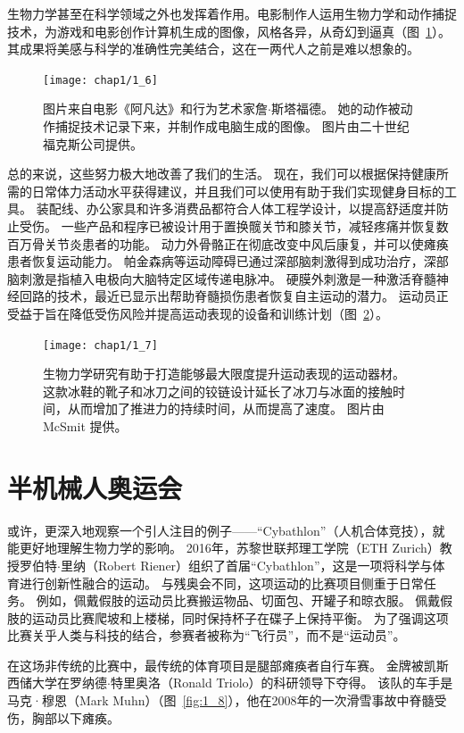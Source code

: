 生物力学甚至在科学领域之外也发挥着作用。电影制作人运用生物力学和动作捕捉技术，为游戏和电影创作计算机生成的图像，风格各异，从奇幻到逼真（图~\ref{fig:1_6}）。
其成果将美感与科学的准确性完美结合，这在一两代人之前是难以想象的。


\begin{figure}[!htb]
	\centering
	\texttt{[image: chap1/1\_6]}
	\caption{图片来自电影《阿凡达》和行为艺术家詹$\cdot$斯塔福德。
		她的动作被动作捕捉技术记录下来，并制作成电脑生成的图像。
		图片由二十世纪福克斯公司提供。 \label{fig:1_6}}
\end{figure}


总的来说，这些努力极大地改善了我们的生活。
现在，我们可以根据保持健康所需的日常体力活动水平获得建议，并且我们可以使用有助于我们实现健身目标的工具。
装配线、办公家具和许多消费品都符合人体工程学设计，以提高舒适度并防止受伤。
一些产品和程序已被设计用于置换髋关节和膝关节，减轻疼痛并恢复数百万骨关节炎患者的功能。
动力外骨骼正在彻底改变中风后康复，并可以使瘫痪患者恢复运动能力。
帕金森病等运动障碍已通过深部脑刺激得到成功治疗，深部脑刺激是指植入电极向大脑特定区域传递电脉冲。
硬膜外刺激是一种激活脊髓神经回路的技术，最近已显示出帮助脊髓损伤患者恢复自主运动的潜力。
运动员正受益于旨在降低受伤风险并提高运动表现的设备和训练计划（图~\ref{fig:1_7}）。


\begin{figure}[!htb]
	\centering
	\texttt{[image: chap1/1\_7]}
	\caption{生物力学研究有助于打造能够最大限度提升运动表现的运动器材。
		这款冰鞋的靴子和冰刀之间的铰链设计延长了冰刀与冰面的接触时间，从而增加了推进力的持续时间，从而提高了速度。
		图片由 McSmit 提供。 \label{fig:1_7}}
\end{figure}



\section{半机械人奥运会}


或许，更深入地观察一个引人注目的例子——“Cybathlon”（人机合体竞技），就能更好地理解生物力学的影响。
2016年，苏黎世联邦理工学院（ETH Zurich）教授罗伯特$\cdot$里纳（Robert Riener）组织了首届“Cybathlon”，这是一项将科学与体育进行创新性融合的运动。
与残奥会不同，这项运动的比赛项目侧重于日常任务。
例如，佩戴假肢的运动员比赛搬运物品、切面包、开罐子和晾衣服。
佩戴假肢的运动员比赛爬坡和上楼梯，同时保持杯子在碟子上保持平衡。
为了强调这项比赛关乎人类与科技的结合，参赛者被称为“飞行员”，而不是“运动员”。


在这场非传统的比赛中，最传统的体育项目是腿部瘫痪者自行车赛。
金牌被凯斯西储大学在罗纳德$\cdot$特里奥洛（Ronald Triolo）的科研领导下夺得。
该队的车手是马克·穆恩（Mark Muhn）（图~\ref{fig:1_8}），他在2008年的一次滑雪事故中脊髓受伤，胸部以下瘫痪。


